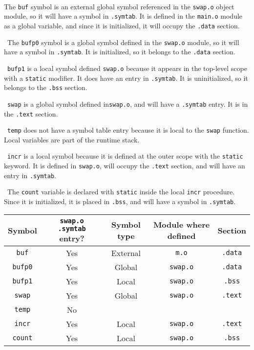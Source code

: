 \documentclass[12pt]{article}
\newenvironment{sol}[1][Solution]{\begin{trivlist}
		\item[\hskip \labelsep {\bfseries #1:}]}{\end{trivlist}}
\begin{document}
\begin{sol}
	\
	
	The \texttt{buf} symbol is an external global symbol referenced in the \texttt{swap.o} object module,
	so it will have a symbol in \texttt{.symtab}. It is defined in the \texttt{main.o} module
	as a global variable, and since it is initialized, it will occupy the \texttt{.data} section.
	
	\
	The \texttt{bufp0} symbol is a global symbol defined in the \texttt{swap.o} module, so it will
	have a symbol in \texttt{.symtab}. It is initialized, so it belongs to the \texttt{.data} section.
	
	\
	\texttt{bufp1} is a local symbol defined \texttt{swap.o} because it appears in the top-level scope
	with a \texttt{static} modifier. It does have an entry in \texttt{.symtab}. It is uninitialized,
	so it belongs to the \texttt{.bss} section.
	
	\
	\texttt{swap} is a global symbol defined in\texttt{swap.o}, and will have a \texttt{.symtab} entry.
	It is in the \texttt{.text} section.
	
	\
	\texttt{temp} does not have a symbol table entry because it is local to the \texttt{swap} function.
	Local variables are part of the runtime stack.
	
	\
	\texttt{incr} is a local symbol because it is defined at the outer scope with the \texttt{static}
	keyword. It is defined in \texttt{swap.o}, will occupy the \texttt{.text} section, and will
	have an entry in \texttt{.symtab}.
	
	\
	The \texttt{count} variable is declared with \texttt{static} inside the local \texttt{incr} procedure.
	Since it is initialized, it is placed in \texttt{.bss}, and will have a symbol in \texttt{.symtab}.
	\begin{center}
		\begin{tabular}{ccccc}
			Symbol & \texttt{swap.o .symtab} entry? & Symbol type & Module where defined & Section\\
			\hline
			
			\texttt{buf} & Yes & External & \texttt{m.o} & \texttt{.data}\\
			
			\texttt{bufp0} & Yes & Global & \texttt{swap.o} & \texttt{.data} \\
			
			\texttt{bufp1} & Yes & Local & \texttt{swap.o} & \texttt{.bss}\\
			
			\texttt{swap} & Yes & Global & \texttt{swap.o} & \texttt{.text}\\
			
			\texttt{temp} & No & \makebox[1cm]{\hrulefill} & \makebox[1cm]{\hrulefill} & \makebox[1cm]{\hrulefill}\\
			
			\texttt{incr} & Yes & Local & \texttt{swap.o} & \texttt{.text}\\
			
			\texttt{count} & Yes & Local & \texttt{swap.o} & \texttt{.bss}
		\end{tabular}
	\end{center}
\end{sol}
\end{document}
